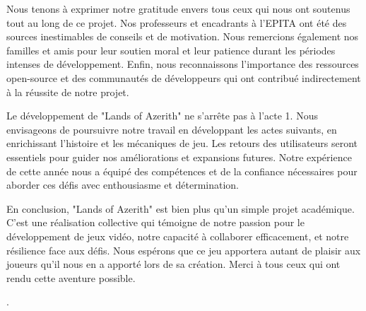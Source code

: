 Nous tenons à exprimer notre gratitude envers tous ceux qui nous ont soutenus tout au long de ce projet. Nos professeurs et encadrants à l'EPITA ont été des sources inestimables de conseils et de motivation. Nous remercions également nos familles et amis pour leur soutien moral et leur patience durant les périodes intenses de développement. Enfin, nous reconnaissons l'importance des ressources open-source et des communautés de développeurs qui ont contribué indirectement à la réussite de notre projet. 

  

Le développement de "Lands of Azerith" ne s'arrête pas à l'acte 1. Nous envisageons de poursuivre notre travail en développant les actes suivants, en enrichissant l'histoire et les mécaniques de jeu. Les retours des utilisateurs seront essentiels pour guider nos améliorations et expansions futures. Notre expérience de cette année nous a équipé des compétences et de la confiance nécessaires pour aborder ces défis avec enthousiasme et détermination. 

  

En conclusion, "Lands of Azerith" est bien plus qu'un simple projet académique. C'est une réalisation collective qui témoigne de notre passion pour le développement de jeux vidéo, notre capacité à collaborer efficacement, et notre résilience face aux défis. Nous espérons que ce jeu apportera autant de plaisir aux joueurs qu'il nous en a apporté lors de sa création. Merci à tous ceux qui ont rendu cette aventure possible. 

  

. 